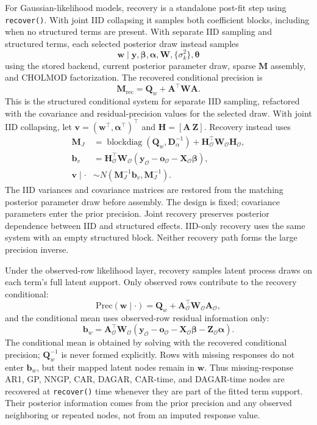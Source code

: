 \documentclass[11pt]{article}
\newcommand{\by}{\bm{y}}
\newcommand{\bw}{\bm{w}}
\newcommand{\balpha}{\bm{\alpha}}
\newcommand{\bbeta}{\bm{\beta}}
\newcommand{\bv}{\bm{v}}
\newcommand{\bb}{\bm{b}}
\newcommand{\bo}{\bm{o}}
\newcommand{\btheta}{\bm{\theta}}
\newcommand{\bA}{\bm{A}}
\newcommand{\bD}{\bm{D}}
\newcommand{\bH}{\bm{H}}
\newcommand{\bM}{\bm{M}}
\newcommand{\bQ}{\bm{Q}}
\newcommand{\bW}{\bm{W}}
\newcommand{\bX}{\bm{X}}
\newcommand{\bZ}{\bm{Z}}
\newcommand{\trans}{^\top}
\begin{document}
For Gaussian-likelihood models, recovery is a standalone post-fit step using
\texttt{recover()}. With joint IID collapsing it samples both coefficient blocks,
including when no structured terms are present. With separate IID sampling and
structured terms, each selected posterior draw instead samples
\begin{equation}
  \bw \mid \by,\bbeta,\balpha,\bW,\{\sigma_k^2\},\btheta
\end{equation}
using the stored backend, current posterior parameter draw, sparse $\bM$ assembly, and CHOLMOD factorization. The recovered conditional precision is
\begin{equation}
  \label{eq:M-rec}
  \bM_{\mathrm{rec}} = \bQ_w + \bA\trans \bW \bA.
\end{equation}
This is the structured conditional system for separate IID sampling, refactored
with the covariance and residual-precision values for the selected draw.
With joint IID collapsing, let $\bv=(\bw\trans,\balpha\trans)\trans$ and
$\bH=[\bA\ \bZ]$. Recovery instead uses
\begin{align}
  \bM_J &= \operatorname{blockdiag}(\bQ_w,\bD_{\alpha}^{-1})
          + \bH_{\mathcal O}\trans\bW_{\mathcal O}\bH_{\mathcal O},\\
  \bb_v &= \bH_{\mathcal O}\trans\bW_{\mathcal O}
          (\by_{\mathcal O}-\bo_{\mathcal O}-\bX_{\mathcal O}\bbeta),\\
  \bv\mid\cdot &\sim N(\bM_J^{-1}\bb_v,\bM_J^{-1}).
\end{align}
The IID variances and covariance matrices are restored from the matching
posterior parameter draw before assembly. The design is fixed; covariance
parameters enter the prior precision. Joint recovery preserves posterior
dependence between IID and structured effects. IID-only recovery uses the same
system with an empty structured block. Neither recovery path forms the large
precision inverse.

Under the observed-row likelihood layer, recovery samples latent process draws on each term's full latent support. Only observed rows contribute to the recovery conditional:
\begin{equation}
  \mathrm{Prec}(\bw \mid \cdot)
    = \bQ_w + \bA_{\mathcal{O}}\trans \bW_{\mathcal{O}} \bA_{\mathcal{O}},
\end{equation}
and the conditional mean uses observed-row residual information only:
\begin{equation}
  \label{eq:recover-rhs}
  \bb_w = \bA_{\mathcal{O}}\trans \bW_{\mathcal{O}}
      \left(\by_{\mathcal{O}} - \bo_{\mathcal{O}} - \bX_{\mathcal{O}}\bbeta
            - \bZ_{\mathcal{O}}\balpha\right).
\end{equation}
The conditional mean is obtained by solving with the recovered conditional precision; $\bQ_w^{-1}$ is never formed explicitly. Rows with missing responses do not enter $\bb_w$, but their mapped latent nodes remain in $\bw$. Thus missing-response AR1, GP, NNGP, CAR, DAGAR, CAR-time, and DAGAR-time nodes are recovered at \texttt{recover()} time whenever they are part of the fitted term support. Their posterior information comes from the prior precision and any observed neighboring or repeated nodes, not from an imputed response value.
\end{document}
